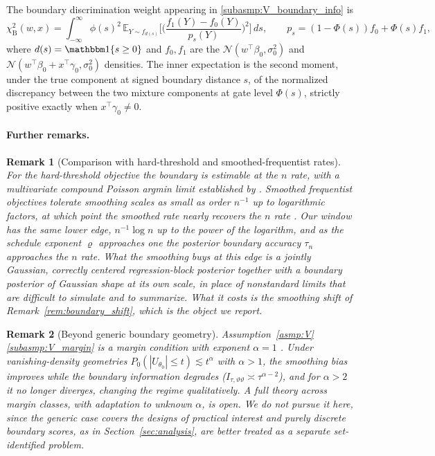 \documentclass[11pt]{article}
\theoremstyle{definition}
\theoremstyle{plain}
\newtheorem{remark}{Remark}
\newcommand{\E}{\mathbb{E}}
\begin{document}
The boundary discrimination weight appearing in \ref{subasmp:V_boundary_info} is
\begin{equation}
\chi^2_{\mathrm B}(w,x)=\int_{-\infty}^{\infty}\phi(s)^2\,
\E_{Y\sim f_{d(s)}}\Bigg[\bigg(\frac{f_1(Y)-f_0(Y)}{p_s(Y)}\bigg)^{\!2}\Bigg]\,ds,
\qquad
p_s=(1-\Phi(s))f_0+\Phi(s)f_1,
\label{eq:chisq_weight}
\end{equation}
where $d(s)=\mathbbm 1\{s\ge0\}$ and $f_0,f_1$ are the $\mathcal N(w^\top\beta_0,\sigma_0^2)$ and $\mathcal N(w^\top\beta_0+x^\top\gamma_0,\sigma_0^2)$ densities. The inner expectation is the second moment, under the true component at signed boundary distance $s$, of the normalized discrepancy between the two mixture components at gate level $\Phi(s)$, strictly positive exactly when $x^\top\gamma_0\neq0$.

\paragraph{Further remarks.}

\begin{remark}[Comparison with hard-threshold and smoothed-frequentist rates]
\label{rem:rate_comparison}
For the hard-threshold objective the boundary is estimable at the $n$ rate, with a multivariate compound Poisson argmin limit established by \citet{Kang2025}. Smoothed frequentist objectives tolerate smoothing scales as small as order $n^{-1}$ up to logarithmic factors, at which point the smoothed rate nearly recovers the $n$ rate \citep[e.g.,][]{SeoLinton2007,Mukherjee2023}. Our window has the same lower edge, $n^{-1}\log n$ up to the power of the logarithm, and as the schedule exponent $\varrho$ approaches one the posterior boundary accuracy $\tau_n$ approaches the $n$ rate. What the smoothing buys at this edge is a jointly Gaussian, correctly centered regression-block posterior together with a boundary posterior of Gaussian shape at its own scale, in place of nonstandard limits that are difficult to simulate and to summarize. What it costs is the smoothing shift of Remark~\ref{rem:boundary_shift}, which is the object we report.
\end{remark}

\begin{remark}[Beyond generic boundary geometry]
\label{rem:nonregular_rates}
Assumption~\ref{asmp:V}\ref{subasmp:V_margin} is a margin condition with exponent $\alpha=1$ \citep{Tsybakov2005}. Under vanishing-density geometries $P_0(|U_{\theta_0}|\le t)\lesssim t^\alpha$ with $\alpha>1$, the smoothing bias improves while the boundary information degrades ($I_{\tau,\vartheta\vartheta}\asymp\tau^{\alpha-2}$), and for $\alpha>2$ it no longer diverges, changing the regime qualitatively. A full theory across margin classes, with adaptation to unknown $\alpha$, is open. We do not pursue it here, since the generic case covers the designs of practical interest and purely discrete boundary scores, as in Section~\ref{sec:analysis}, are better treated as a separate set-identified problem.
\end{remark}
\end{document}
